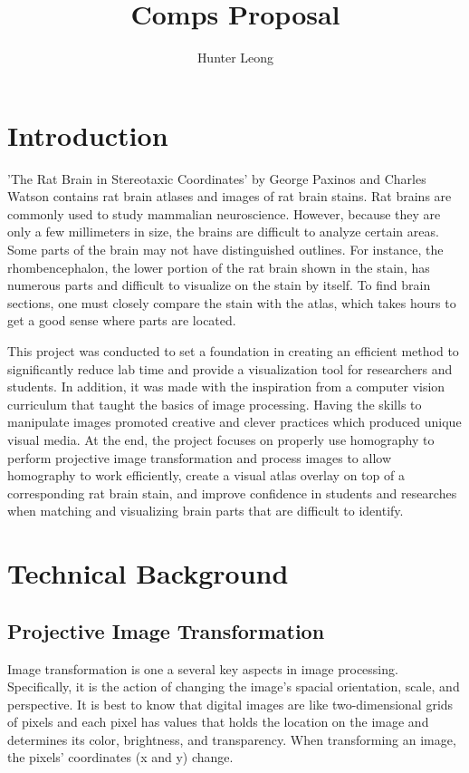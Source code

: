 \documentclass[10pt,twocolumn]{article}
\title{Comps Proposal}
\author{Hunter Leong}
\affiliation{Occidental College}
\begin{document}
\maketitle

\section{Introduction}
'The Rat Brain in Stereotaxic Coordinates' by George Paxinos and Charles Watson contains rat brain atlases and images of rat brain stains. Rat brains are commonly used to study mammalian neuroscience. However, because they are only a few millimeters in size, the brains are difficult to analyze certain areas. Some parts of the brain may not have distinguished outlines. For instance, the rhombencephalon, the lower portion of the rat brain shown in the stain, has numerous parts and difficult to visualize on the stain by itself. To find brain sections, one must closely compare the stain with the atlas, which takes hours to get a good sense where parts are located.

This project was conducted to set a foundation in creating an efficient method to significantly reduce lab time and provide a visualization tool for researchers and students. In addition, it was made with the inspiration from a computer vision curriculum that taught the basics of image processing. Having the skills to manipulate images promoted creative and clever practices which produced unique visual media. At the end, the project focuses on properly use homography to perform projective image transformation and process images to allow homography to work efficiently, create a visual atlas overlay on top of a corresponding rat brain stain, and improve confidence in students and researches when matching and visualizing brain parts that are difficult to identify. 



\section{Technical Background}

\subsection{Projective Image Transformation}
Image transformation is one a several key aspects in image processing. Specifically, it is the action of changing the image's spacial orientation, scale, and perspective. It is best to know that digital images are like two-dimensional grids of pixels and each pixel has values that holds the location on the image and determines its color, brightness, and transparency. When transforming an image, the pixels' coordinates (x and y) change.
\end{document}
